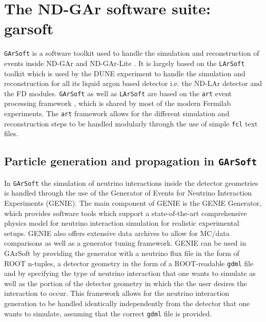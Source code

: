 \section{The ND-GAr software suite: garsoft}
\label{Sec:GArSoft_Lite}
\texttt{GArSoft} is a software toolkit used to handle the simulation and reconstruction of events inside ND-GAr and ND-GAr-Lite \cite{garsoft}. It is largely based on the \texttt{LArSoft} toolkit \cite{Church:2013hea,LArSoft} which is used by the DUNE experiment to handle the simulation and reconstruction for all its liquid argon based detector i.e. the ND-LAr detector and the FD modules. \texttt{GArSoft} as well as \texttt{LArSoft} are based on the \texttt{art} event processing framework \cite{Green:2012gv}, which is shared by most of the modern Fermilab experiments. The \texttt{art} framework allows for the different simulation and reconstruction steps to be handled modularly through the use of simple \texttt{fcl} text files.

\subsection{Particle generation and propagation in \texttt{GArSoft}}
\label{Sec:GArSoft_PartGen}
In \texttt{GArSoft} the simulation of neutrino interactions inside the detector geometries is handled through the use of the Generator of Events for Neutrino Interaction Experiments (GENIE). The main component of GENIE is the GENIE Generator, which provides software tools which support a state-of-the-art comprehensive physics model for neutrino interaction simulation for realistic experimental setups. GENIE also offers extensive data archives to allow for MC/data comparisons as well as a generator tuning framework. GENIE can be used in GArSoft by providing the generator with a neutrino flux file in the form of ROOT n-tuples, a detector geometry in the form of a ROOT-readable \texttt{gdml} file and by specifying the type of neutrino interaction that one wants to simulate as well as the portion of the detector geometry in which the the user desires the interaction to occur. This framework allows for the neutrino interaction generation to be handled identically independently from the detector that one wants to simulate, assuming that the correct \texttt{gdml} file is provided. 

